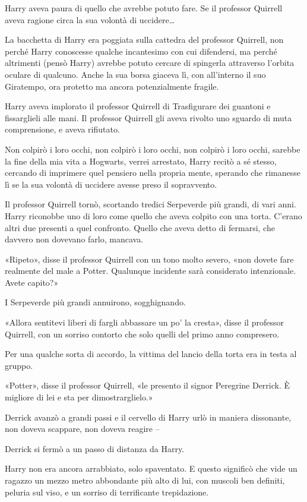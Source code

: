 Harry aveva paura di quello che avrebbe potuto fare. Se il professor Quirrell aveva ragione circa la sua volontà di uccidere…

La bacchetta di Harry era poggiata sulla cattedra del professor Quirrell, non perché Harry conoscesse qualche incantesimo con cui difendersi, ma perché altrimenti (pensò Harry) avrebbe potuto cercare di spingerla attraverso l’orbita oculare di qualcuno. Anche la sua borsa giaceva lì, con all’interno il suo Giratempo, ora protetto ma ancora potenzialmente fragile.

Harry aveva implorato il professor Quirrell di Trasfigurare dei guantoni e fissarglieli alle mani. Il professor Quirrell gli aveva rivolto uno sguardo di muta comprensione, e aveva rifiutato.

Non colpirò i loro occhi, non colpirò i loro occhi, non colpirò i loro occhi, sarebbe la fine della mia vita a Hogwarts, verrei arrestato, Harry recitò a sé stesso, cercando di imprimere quel pensiero nella propria mente, sperando che rimanesse lì se la sua volontà di uccidere avesse preso il sopravvento.

Il professor Quirrell tornò, scortando tredici Serpeverde più grandi, di vari anni. Harry riconobbe uno di loro come quello che aveva colpito con una torta. C’erano altri due presenti a quel confronto. Quello che aveva detto di fermarsi, che davvero non dovevano farlo, mancava.

«Ripeto», disse il professor Quirrell con un tono molto severo, «non dovete fare realmente del male a Potter. Qualunque incidente sarà considerato intenzionale. Avete capito?»

I Serpeverde più grandi annuirono, sogghignando.

«Allora sentitevi liberi di fargli abbassare un po’ la cresta», disse il professor Quirrell, con un sorriso contorto che solo quelli del primo anno compresero.

Per una qualche sorta di accordo, la vittima del lancio della torta era in testa al gruppo.

«Potter», disse il professor Quirrell, «le presento il signor Peregrine Derrick. È migliore di lei e sta per dimostrarglielo.»

Derrick avanzò a grandi passi e il cervello di Harry urlò in maniera dissonante, non doveva scappare, non doveva reagire –

Derrick si fermò a un passo di distanza da Harry.

Harry non era ancora arrabbiato, solo spaventato. E questo significò che vide un ragazzo un mezzo metro abbondante più alto di lui, con muscoli ben definiti, peluria sul viso, e un sorriso di terrificante trepidazione.

